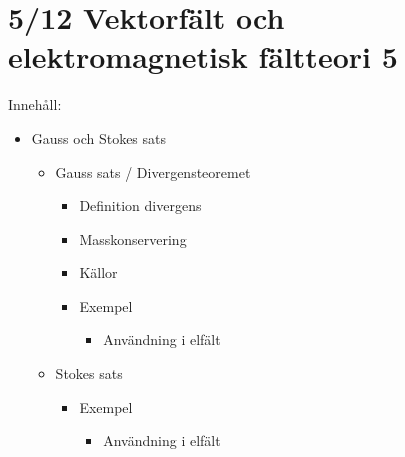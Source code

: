 \section{5/12 \quad Vektorfält och elektromagnetisk fältteori \quad \textcircled{5}}

Innehåll:
\begin{itemize}[label=--]
  \item Gauss och Stokes sats
  \begin{itemize}[label=+]
    \item Gauss sats / Divergensteoremet
    \begin{itemize}[label=--]
      \item Definition divergens
      \item Masskonservering
      \item Källor
      \item Exempel
      \begin{itemize}[label=+]
        \item Användning i elfält
      \end{itemize}
    \end{itemize}
    \item Stokes sats
    \begin{itemize}[label=--]
      \item Exempel
      \begin{itemize}[label=+]
        \item Användning i elfält
      \end{itemize}
    \end{itemize}
  \end{itemize}
\end{itemize}

